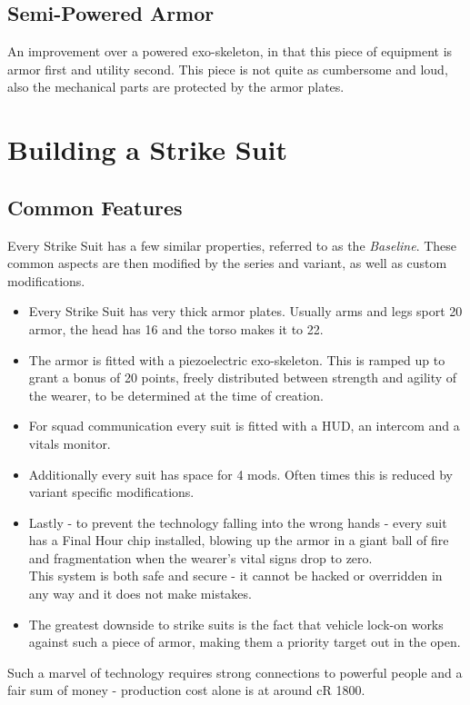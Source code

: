 \documentclass[12pt,a4paper,openany,usenames,dvipsnames]{book}
\begin{document}
	\section{Semi-Powered Armor}
	An improvement over a powered exo-skeleton, in that this piece of equipment is armor first and utility second. This piece is not quite as cumbersome and loud, also the mechanical parts are protected by the armor plates.
	\par
	
	\chapter{Building a Strike Suit}
	\label{ch:building}
	\section{Common Features}
	Every Strike Suit has a few similar properties, referred to as the \emph{Baseline}. These common aspects are then modified by the series and variant, as well as custom modifications.\par
	\begin{itemize}
		\setlength\itemsep{-5mm}
		\item Every Strike Suit has very thick armor plates. Usually arms and legs sport 20 armor, the head has 16 and the torso makes it to 22.
		\item The armor is fitted with a piezoelectric exo-skeleton. This is ramped up to grant a bonus of 20 points, freely distributed between strength and agility of the wearer, to be determined at the time of creation.
		\item For squad communication every suit is fitted with a HUD, an intercom and a vitals monitor.
		\item Additionally every suit has space for 4 mods. Often times this is reduced by variant specific modifications.
		\item Lastly - to prevent the technology falling into the wrong hands - every suit has a Final Hour chip installed, blowing up the armor in a giant ball of fire and fragmentation when the wearer's vital signs drop to zero.\\
		This system is both safe and secure - it cannot be hacked or overridden in any way and it does not make mistakes.
		\item The greatest downside to strike suits is the fact that vehicle lock-on works against such a piece of armor, making them a priority target out in the open.
	\end{itemize}
	\par
	Such a marvel of technology requires strong connections to powerful people and a fair sum of money - production cost alone is at around cR 1800.
\end{document}
